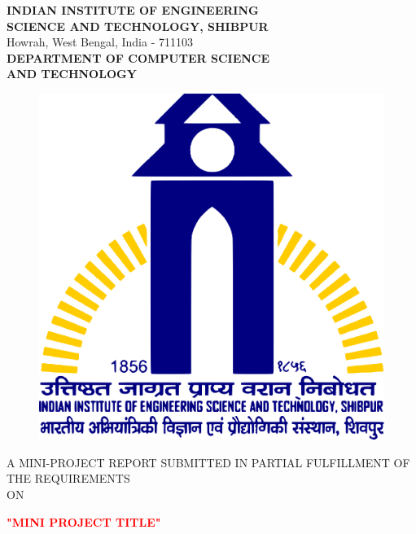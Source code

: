 \documentclass[a4paper]{article}
\begin{document}
\begin{titlepage}

    \begin{center}

        \textup{\large  \textbf{INDIAN INSTITUTE OF ENGINEERING}\\\textbf{SCIENCE AND TECHNOLOGY, SHIBPUR}}\\ Howrah, West Bengal, India - 711103\\[0.5cm]\textbf{\large DEPARTMENT OF COMPUTER SCIENCE}\\\textbf{\large AND TECHNOLOGY}

        \begin{center}
            \begin{figure}[h]   %
                \centering
                \includegraphics[width=0.3\linewidth]{Pictures/IIESTS Logo.png}
            \end{figure}
        \end{center}


        \textup{\large A MINI-PROJECT REPORT SUBMITTED IN PARTIAL FULFILLMENT OF THE REQUIREMENTS\\[0.4cm]ON}\\[0.4cm]

        \begin{LARGE}
            {\textbf {\textcolor{red}{"MINI PROJECT TITLE"}}}
        \end{LARGE}\\[1cm]


\end{center}
\end{titlepage}
\end{document}
